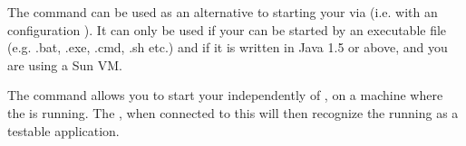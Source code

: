 


The  command can be used as an alternative to starting your \gdaut{} via \app{} (i.e. with an \gdaut{} configuration ). It can only be used if your \gdaut{} can be started by an executable file (e.g. .bat, .exe, .cmd, .sh etc.) and if it is written in Java 1.5 or above, and you are using a Sun VM. 



The command allows you to start your \gdaut{} independently of \app{}, on a machine where the \gdagent{} is running. The \app{} \ite{}, when connected to this \gdagent{} will then recognize the running \gdaut{} as a testable application. 

